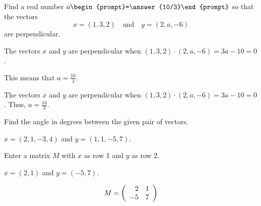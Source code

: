 \documentclass{ximera}
\def\AND{\quad\mbox{and}\quad}
\begin{document}



\problemlabel

\begin{exercise} \label{c1.4.2}
Find a real number $a\begin{prompt}=\answer{10/3}\end{prompt}$ so that the vectors
\[
x = (1,3,2) \AND y = (2,a,-6)
\]
are perpendicular.
\begin{hint}
  The vectors $x$ and $y$ are perpendicular when
$(1,3,2) \cdot (2,a,-6) = 3a - 10 = 0$.
\end{hint}
\begin{hint}
  This means that $a = \frac{10}{3}$.
\end{hint}

\begin{solution}

The vectors $x$ and $y$ are perpendicular when $(1,3,2) \cdot (2,a,-6) = 3a - 10 = 0$.  Thus, $a = \frac{10}{3}$.

\end{solution}
\end{exercise}





\matlabproblemlabel

\noindent Find the angle in degrees between the given pair of vectors.

\begin{computerExercise} \label{c1.4.6a}
$x=(2,1,-3,4)$ and $y=(1,1,-5,7)$.

\end{computerExercise}





\matlabproblemlabel

\noindent Enter a matrix $M$ with $x$ as row 1 and $y$ as row 2.  

\begin{exercise}
$x=(2,1)$ and $y=(-5,7)$.

\begin{solution}
\[
M = \left(\begin{array}{rr} 2 & 1 \\ -5 & 7 \end{array}\right)
\]
\end{solution}
\end{exercise}


\end{document}
